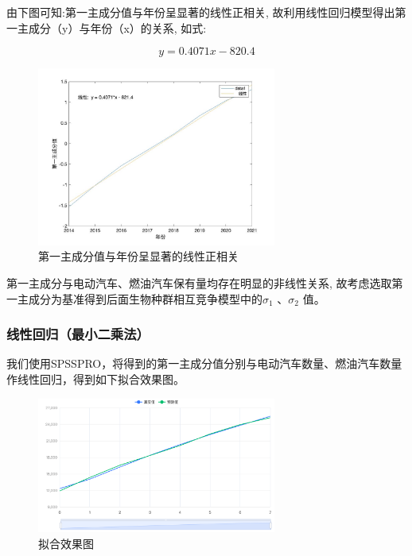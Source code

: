 \documentclass[12pt, a4paper, oneside]{ctexart}
\begin{document}
由下图可知:第一主成分值与年份呈显著的线性正相关,
故利用线性回归模型得出第一主成分（y）与年份（x）的关系, 如式:

\begin{dmath}
  y=0.4071x-820.4
\end{dmath}

\begin{figure}[H]
  \centering
  \includegraphics[width=0.7\textwidth]{pic/第一主成分值（1）.jpg}
  \caption{第一主成分值与年份呈显著的线性正相关}
  \label{fig:第一主成分值与年份}
\end{figure}

第一主成分与电动汽车、燃油汽车保有量均存在明显的非线性关系,
故考虑选取第一主成分为基准得到后面生物种群相互竞争模型中的$\sigma_1$
  、$\sigma_2$ 值。

\subsubsection{{线性回归（最小二乘法）}}

我们使用SPSSPRO，将得到的第一主成分值分别与电动汽车数量、燃油汽车数量作线性回归，得到如下拟合效果图。

\begin{figure}[H]
  \centering
  \includegraphics[width=0.7\textwidth]{pic/拟合效果图 (1).png}
  \caption{拟合效果图}
  \label{fig:拟合效果图}
\end{figure}
\end{document}
